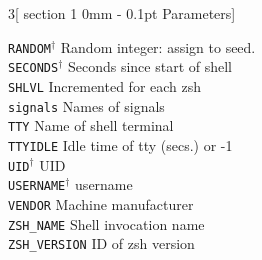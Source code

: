 \documentclass{article}
\makeatletter
\renewcommand{\section}{\@startsection
  {section}%
  {1}%
  {0mm}%
  {-\baselineskip}%
  {0.1pt}%
  {\normalfont\normalsize\scshape}} %
\newcommand\T[1]{\texttt{#1}}
\newcommand\D{$^\dag$}
\makeatother
\begin{document}
\begin{multicols}{3}[\section{Parameters}]
\begin{tabbing}
\T{RANDOM}\D      \>\> Random integer: assign to seed. \\
\T{SECONDS}\D     \>\> Seconds since start of shell \\
\T{SHLVL}         \>\> Incremented for each zsh \\
\T{signals}       \>\> Names of signals \\
\T{TTY}           \>\> Name of shell terminal \\
\T{TTYIDLE}       \>\> Idle time of tty (secs.) or -1 \\
\T{UID}\D         \>\> UID \\
\T{USERNAME}\D    \>\> username \\
\T{VENDOR}        \>\> Machine manufacturer \\
\verb!ZSH_NAME!   \>\> Shell invocation name \\
\verb!ZSH_VERSION! \>\> ID of zsh version \\
\end{tabbing}


\end{multicols}
\end{document}
